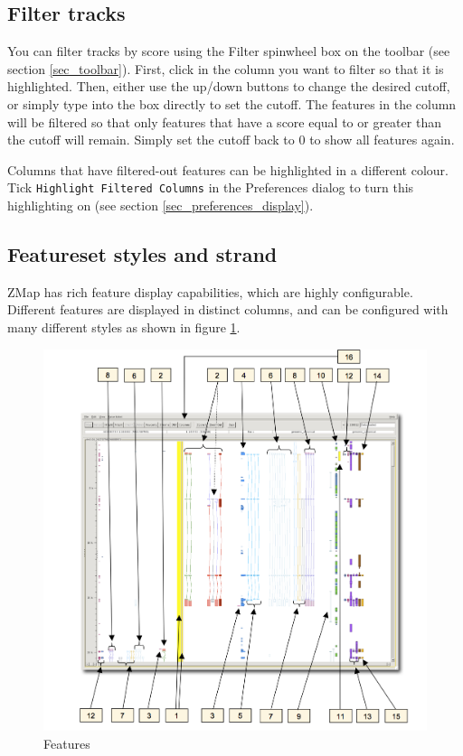 \documentclass[letterpaper]{article}
\begin{document}
\subsection{Filter tracks} \label{sec_filter}
You can filter tracks by score using the Filter spinwheel box on the toolbar (see section \ref{sec_toolbar}). First, click in the column you want to filter so that it is highlighted. Then, either use the up/down buttons to change the desired cutoff, or simply type into the box directly to set the cutoff. The features in the column will be filtered so that only features that have a score equal to or greater than the cutoff will remain. Simply set the cutoff back to 0 to show all features again.

Columns that have filtered-out features can be highlighted in a different colour. Tick \lstinline{Highlight Filtered Columns} in the Preferences dialog to turn this highlighting on (see section \ref{sec_preferences_display}).


\subsection{Featureset styles and strand}
ZMap has rich feature display capabilities, which are highly configurable. Different features are displayed in distinct columns, and can be configured with many different styles as shown in figure \ref{img_features}. 

\begin{figure}
\centering
\color[rgb]{0.30980393,0.5058824,0.7411765}
\includegraphics[width=15.231cm]{images/features.png}
\caption{Features}
\label{img_features}
\end{figure}
\end{document}
